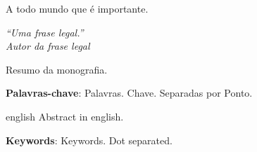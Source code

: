 \documentclass[
	12pt,				%
	openright,			%
	oneside,			%
	a4paper,			%
	english,			%
	french,				%
	spanish,			%
	brazil				%
	]{abntex2}
\theoremstyle{plain}
\theoremstyle{definition}
\theoremstyle{remark}
\begin{document}
\begin{agradecimentos}

A todo mundo que é importante.

\end{agradecimentos}

\begin{epigrafe}
    \vspace*{\fill}
	\begin{flushright}
		\textit{``Uma frase legal.'' \\
		Autor da frase legal} \vspace*{3cm}
	\end{flushright}
\end{epigrafe}


\setlength{\absparsep}{18pt} %
\begin{resumo}
Resumo da monografia.

 \textbf{Palavras-chave}: Palavras. Chave. Separadas por Ponto.
\end{resumo}

\begin{resumo}[Abstract]
 \begin{otherlanguage*}{english}
Abstract in english.

   \vspace{\onelineskip}
 
   \noindent 
   \textbf{Keywords}: Keywords. Dot separated.
 \end{otherlanguage*}
\end{resumo}


\listoffigures*
\cleardoublepage


\listoftables
\cleardoublepage

\tableofcontents* 
\cleardoublepage



\textual


\renewcommand{\thetable}{\thechapter.\arabic{table}}
\setcounter{table}{0}
\renewcommand{\thefigure}{\thechapter.\arabic{figure}}
\setcounter{figure}{0}
\renewcommand{\theequation}{\thechapter.\arabic{equation}}
\setcounter{equation}{0}
\end{document}
